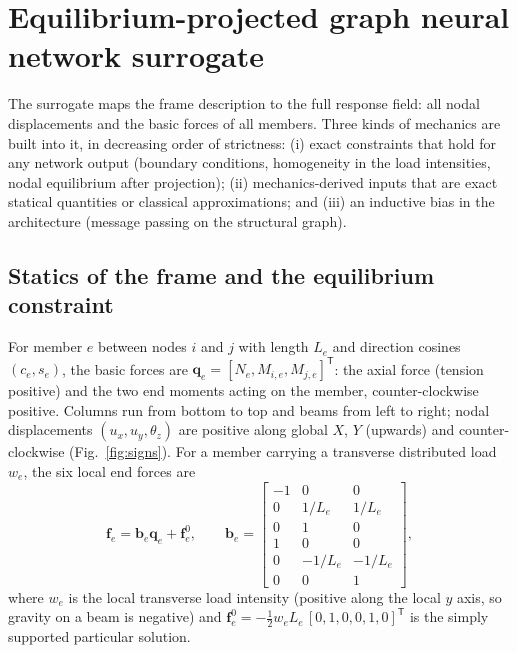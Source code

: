 \section{Equilibrium-projected graph neural network surrogate}\label{sec:method}

The surrogate maps the frame description to the full response field: all nodal displacements and the basic forces of all members. Three kinds of mechanics are built into it, in decreasing order of strictness: (i) exact constraints that hold for any network output (boundary conditions, homogeneity in the load intensities, nodal equilibrium after projection); (ii) mechanics-derived inputs that are exact statical quantities or classical approximations; and (iii) an inductive bias in the architecture (message passing on the structural graph).

\subsection{Statics of the frame and the equilibrium constraint}\label{sec:statics}
For member $e$ between nodes $i$ and $j$ with length $L_e$ and direction cosines $(c_e,s_e)$, the basic forces are $\mathbf{q}_e = [N_e, M_{i,e}, M_{j,e}]^{\mathsf T}$: the axial force (tension positive) and the two end moments acting on the member, counter-clockwise positive. Columns run from bottom to top and beams from left to right; nodal displacements $(u_x,u_y,\theta_z)$ are positive along global $X$, $Y$ (upwards) and counter-clockwise (Fig.~\ref{fig:signs}). For a member carrying a transverse distributed load $w_e$, the six local end forces are
\begin{equation}
\mathbf{f}_e = \mathbf{b}_e\mathbf{q}_e + \mathbf{f}^{0}_e, \qquad
\mathbf{b}_e = \begin{bmatrix} -1 & 0 & 0\\ 0 & 1/L_e & 1/L_e \\ 0 & 1 & 0 \\ 1 & 0 & 0 \\ 0 & -1/L_e & -1/L_e \\ 0 & 0 & 1 \end{bmatrix},
\end{equation}
where $w_e$ is the local transverse load intensity (positive along the local $y$ axis, so gravity on a beam is negative) and $\mathbf{f}^{0}_e = -\tfrac{1}{2}w_eL_e\,[0,1,0,0,1,0]^{\mathsf T}$ is the simply supported particular solution.

